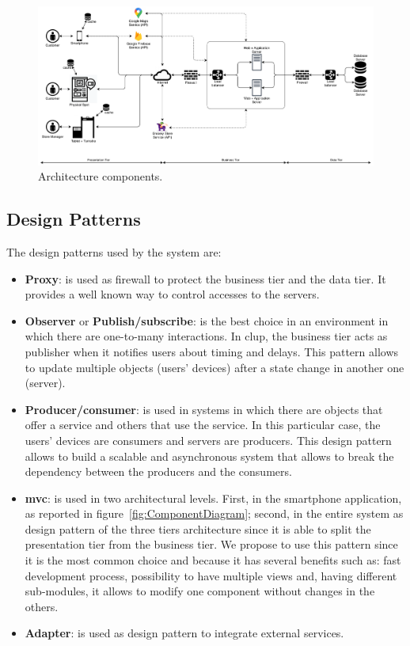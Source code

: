 \begin{figure}
    \centering
    \includegraphics[width=1.0\textwidth]{images/architecture_components.pdf}
    \caption{Architecture components.}\label{fig:ArchitectureComponents}
\end{figure}

\subsection{Design Patterns}

The design patterns used by the system are:
\begin{itemize}
    \item \textbf{Proxy}: is used as firewall to protect the business tier and the data tier. It provides a well known way to control accesses to the servers.
    \item \textbf{Observer} or \textbf{Publish/subscribe}: is the best choice in an environment in which there are one-to-many interactions. In \gls{clup}, the business tier acts as publisher when it notifies users about timing and delays. This pattern allows to update multiple objects (users' devices) after a state change in another one (server).
    \item \textbf{Producer/consumer}: is used in systems in which there are objects that offer a service and others that use the service. In this particular case, the users' devices are consumers and servers are producers. This design pattern allows to build a scalable and asynchronous system that allows to break the dependency between the producers and the consumers.
    \item \textbf{\gls{mvc}}: is used in two architectural levels. First, in the smartphone application, as reported in figure~\ref{fig:ComponentDiagram}; second, in the entire system as design pattern of the three tiers architecture since it is able to split the presentation tier from the business tier.
    We propose to use this pattern since it is the most common choice and because it has several benefits such as: fast development process, possibility to have multiple views and, having different sub-modules, it allows to modify one component without changes in the others.
    \item \textbf{Adapter}: is used as design pattern to integrate external services.
\end{itemize}


